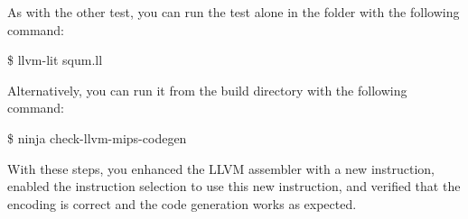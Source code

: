 As with the other test, you can run the test alone in the folder with the following command:\par

\begin{tcolorbox}[colback=white,colframe=black]
\$ llvm-lit squm.ll
\end{tcolorbox}

Alternatively, you can run it from the build directory with the following command:

\begin{tcolorbox}[colback=white,colframe=black]
	\$  ninja check-llvm-mips-codegen
\end{tcolorbox}

With these steps, you enhanced the LLVM assembler with a new instruction, enabled the instruction selection to use this new instruction, and verified that the encoding is correct and the code generation works as expected.\par

































